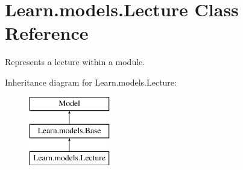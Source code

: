 \hypertarget{class_learn_1_1models_1_1_lecture}{\section{Learn.\-models.\-Lecture Class Reference}
\label{class_learn_1_1models_1_1_lecture}
}


Represents a lecture within a module.  


Inheritance diagram for Learn.\-models.\-Lecture\-:\begin{figure}[H]
\begin{center}
\leavevmode
\includegraphics[height=3.000000cm]{class_learn_1_1models_1_1_lecture}
\end{center}
\end{figure}
